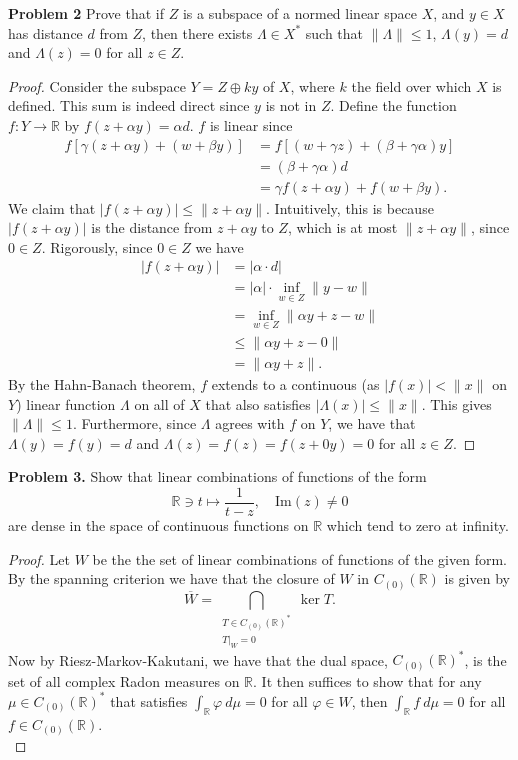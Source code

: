 \documentclass[11pt,letterpaper]{report}
\newcommand{\reals}{\mathbb{R}}
\begin{document}
\noindent\textbf{Problem 2}
Prove that if $Z$ is a subspace of a normed linear space $X$, and $y\in X$ has distance $d$ from $Z$, then there exists $\Lambda\in X^*$ such that $\|\Lambda\|\leq 1$, $\Lambda(y) = d$ and $\Lambda(z) =0$ for all $z\in Z$.
\begin{proof}
	Consider the subspace $Y = Z\oplus ky$ of $X$, where $k$ the field over which $X$ is defined. This sum is indeed direct since $y$ is not in $Z$. Define the function $f: Y\to \reals$ by $f(z + \alpha y) = \alpha d$. $f$ is linear since
	\begin{align*}
		f[\gamma(z+\alpha y) + (w + \beta y)] &= f[(w+\gamma z) + (\beta+\gamma\alpha)y]\\
		&= (\beta+\gamma\alpha)d\\
		&= \gamma f(z+\alpha y) + f(w+\beta y).
	\end{align*}
	We claim that $|f(z+\alpha y)|\leq \|z+\alpha y\|$. Intuitively, this is because $|f(z+\alpha y)|$ is the distance from $z+\alpha y$ to $Z$, which is at most $\|z+\alpha y\|$, since $0\in Z$. Rigorously, since $0\in Z$ we have
	\begin{align*}
		|f(z+\alpha y)| &= |\alpha\cdot d|\\
		&= |\alpha|\cdot \inf_{w\in Z}\|y - w\|\\
		&= \inf_{w\in Z}\|\alpha y + z - w\|\\
		&\leq \|\alpha y+z - 0\|\\
		&= \|\alpha y + z\|.
	\end{align*}
	By the Hahn-Banach theorem, $f$ extends to a continuous (as $|f(x)|<\|x\|$ on $Y$) linear function $\Lambda$ on all of $X$ that also satisfies $|\Lambda(x)|\leq \|x\|$. This gives $\|\Lambda\|\leq 1$. Furthermore, since $\Lambda$ agrees with $f$ on $Y$, we have that $\Lambda(y) = f(y) = d$ and $\Lambda(z) = f(z) = f(z+0y) = 0$ for all $z\in Z$.
\end{proof}

\noindent\textbf{Problem 3. }
Show that linear combinations of functions of the form
\[
\reals \ni t\mapsto \frac{1}{t-z},\quad \text{Im}(z)\neq 0
\]
are dense in the space of continuous functions on $\reals$ which tend to zero at infinity.
\begin{proof}
	Let $W$ be the the set of linear combinations of functions of the given form. By the spanning criterion we have that the closure of $W$ in $C_{(0)}(\reals)$ is given by
	\[
	\overline{W} = \bigcap_{\substack{T\in C_{(0)}(\reals)^*\\T|_{W} = 0}} \ker T.
	\]
	Now by Riesz-Markov-Kakutani, we have that the dual space, $C_{(0)}(\reals)^*$, is the set of all complex Radon measures on $\reals$. It then suffices to show that for any $\mu \in C_{(0)}(\reals)^*$ that satisfies $\int_\reals \varphi\ d\mu = 0$ for all $\varphi\in W$, then $\int_\reals f\ d\mu = 0$ for all $f\in C_{(0)}(\reals)$.\\
	

	

\end{proof}
\end{document}
